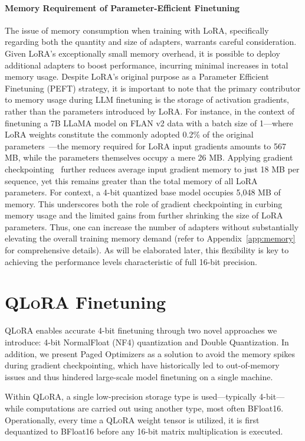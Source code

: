 \paragraph{Memory Requirement of Parameter-Efficient Finetuning} The issue of memory consumption when training with LoRA, specifically regarding both the quantity and size of adapters, warrants careful consideration. Given LoRA's exceptionally small memory overhead, it is possible to deploy additional adapters to boost performance, incurring minimal increases in total memory usage. Despite LoRA's original purpose as a Parameter Efficient Finetuning (PEFT) strategy, it is important to note that the primary contributor to memory usage during LLM finetuning is the storage of activation gradients, rather than the parameters introduced by LoRA. For instance, in the context of finetuning a 7B LLaMA model on FLAN v2 data with a batch size of 1—where LoRA weights constitute the commonly adopted 0.2\% of the original parameters~\citep{hu2021lora,liu2022few}—the memory required for LoRA input gradients amounts to 567 MB, while the parameters themselves occupy a mere 26 MB. Applying gradient checkpointing~\citep{chen2016training} further reduces average input gradient memory to just 18 MB per sequence, yet this remains greater than the total memory of all LoRA parameters. For context, a 4-bit quantized base model occupies 5,048 MB of memory. This underscores both the role of gradient checkpointing in curbing memory usage and the limited gains from further shrinking the size of LoRA parameters. Thus, one can increase the number of adapters without substantially elevating the overall training memory demand (refer to Appendix~\ref{app:memory} for comprehensive details). As will be elaborated later, this flexibility is key to achieving the performance levels characteristic of full 16-bit precision.

\section{\textsc{QLoRA} Finetuning}

\textsc{QLoRA} enables accurate 4-bit finetuning through two novel approaches we introduce: 4-bit NormalFloat (NF4) quantization and Double Quantization. In addition, we present Paged Optimizers as a solution to avoid the memory spikes during gradient checkpointing, which have historically led to out-of-memory issues and thus hindered large-scale model finetuning on a single machine.

Within \textsc{QLoRA}, a single low-precision storage type is used—typically 4-bit—while computations are carried out using another type, most often BFloat16. Operationally, every time a \textsc{QLoRA} weight tensor is utilized, it is first dequantized to BFloat16 before any 16-bit matrix multiplication is executed.

